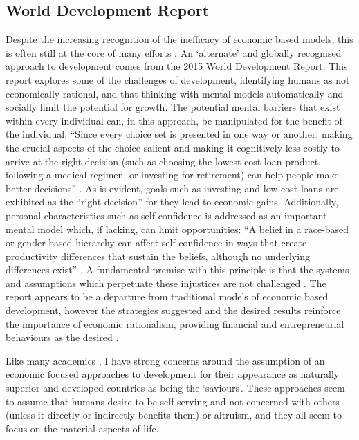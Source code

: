 \subsection{World Development Report}
Despite the increasing recognition of the inefficacy of economic based models, this is often still at the core of many efforts \citep{Karlberg2016}. An `alternate' and globally recognised approach to development comes from the 2015 World Development Report. This report explores some of the challenges of development, identifying humans as not economically rational, and that thinking with mental models automatically and socially limit the potential for growth. The potential mental barriers that exist within every individual can, in this approach, be manipulated for the benefit of the individual: “Since every choice set is presented in one way or another, making the crucial aspects of the choice salient and making it cognitively less costly to arrive at the right decision (such as choosing the lowest-cost loan product, following a medical regimen, or investing for retirement) can help people make better decisions” \citep[][p38]{TheWorldBank2015}. As is evident, goals such as investing and low-cost loans are exhibited as the “right decision” for they lead to economic gains. Additionally, personal characteristics such as self-confidence is addressed as an important mental model which, if lacking, can limit opportunities: “A belief in a race-based or gender-based hierarchy can affect self-confidence in ways that create productivity differences that sustain the beliefs, although no underlying differences exist” \citep[][p69]{TheWorldBank2015}. A fundamental premise with this principle is that the systems and assumptions which perpetuate these injustices are not challenged \citep{Biccum2016}. The report appears to be a departure from traditional models of economic based development, however the strategies suggested and the desired results reinforce the importance of economic rationalism, providing financial and entrepreneurial behaviours as the desired \citep{Biccum2016}. 

Like many academics \citep{Biccum2016,Karlberg2016}, I have strong concerns around the assumption of an economic focused approaches to development for their appearance as naturally superior and developed countries as being the `saviours'. These approaches seem to assume that humans desire to be self-serving and not concerned with others (unless it directly or indirectly benefits them) or altruism, and they all seem to focus on the material aspects of life. 



